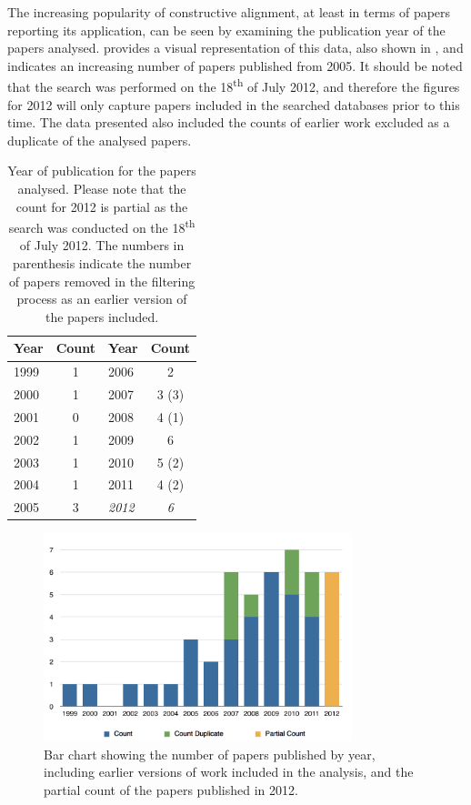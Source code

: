The increasing popularity of constructive alignment, at least in terms of papers reporting its application, can be seen by examining the publication year of the papers analysed.  provides a visual representation of this data, also shown in , and indicates an increasing number of papers published from 2005. It should be noted that the search was performed on the 18\textsuperscript{th} of July 2012, and therefore the figures for 2012 will only capture papers included in the searched databases prior to this time. The data presented also included the counts of earlier work excluded as a duplicate of the analysed papers.

\begin{table}[htbp]
	\centering
	\caption{Year of publication for the papers analysed. Please note that the count for 2012 is partial as the search was conducted on the 18\textsuperscript{th} of July 2012. The numbers in parenthesis indicate the number of papers removed in the filtering process as an earlier version of the papers included. }
	\label{tbl:year}
	\footnotesize
    \begin{tabular}{lc||lc}
    \textbf{Year} & \textbf{Count} & \textbf{Year} & \textbf{Count} \\ \hline
		1999	&	1	& 		2006	&	2		\\
		2000	&	1	& 		2007	&	3 (3)	\\
		2001	&	0	& 		2008	&	4 (1)	\\
		2002	&	1	& 		2009	&	6		\\
		2003	&	1	& 		2010	&	5 (2)	\\
		2004	&	1	& 		2011	&	4 (2)	\\
		2005	&	3	& 		\emph{2012}	&	\emph{6}	\\
    \end{tabular}
\end{table}

\begin{figure}[htbp]
	\centering
	\includegraphics[width=0.8\textwidth]{Year}
	\caption{Bar chart showing the number of papers published by year, including earlier versions of work included in the analysis, and the partial count of the papers published in 2012.}
	\label{fig:year}
\end{figure}


